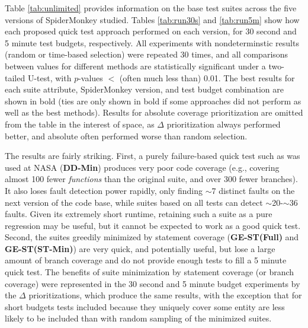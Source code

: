 Table \ref{tab:unlimited} provides information on the base test suites
across the five versions of SpiderMonkey studied.  Tables
\ref{tab:run30s} and \ref{tab:run5m} show how each proposed quick test
approach performed on each version, for 30 second and 5 minute test
budgets, respectively.  All experiments with nondeterminstic results
(random or time-based selection) were repeated 30 times, and all
comparisons between values for different methods are statistically
significant under a two-tailed U-test, with $p$-values $<$ (often much less
than) 0.01.  The best results for each suite attribute, SpiderMonkey
version, and test budget combination are shown in bold (ties are only
shown in bold if some approaches did not perform as well as the best
methods).  Results for absolute coverage prioritization are omitted
from the table in the interest of space, as $\Delta$ prioritization
always performed better, and absolute often performed worse than
random selection.

The results are fairly striking.  First, a purely failure-based quick
test such as was used at NASA ({\bf DD-Min}) produces very poor code
coverage (e.g., covering almost 100 fewer \emph{functions} than the
original suite, and over 300 fewer branches).  It also loses fault
detection power rapidly, only finding $\sim$7 distinct faults on the
next version of the code base, while suites based on all tests can
detect $\sim$20-$\sim$36 faults.  Given its extremely short runtime,
retaining such a suite as a pure regression may be useful, but it
cannot be expected to work as a good quick test.  Second, the suites
greedily minimized by statement coverage ({\bf GE-ST(Full)} and {\bf
GE-ST(ST-Min)}) are very quick, and potentially useful, but lose a
large amount of branch coverage and do not provide enough tests to
fill a 5 minute quick test.  The benefits of suite minimization by
statement coverage (or branch coverage) were represented in the 30
second and 5 minute budget experiments by the $\Delta$ prioritizations,
which produce the same results, with the exception that for short
budgets tests included because they uniquely cover some entity are
less likely to be included than with random sampling of the minimized
suites.

